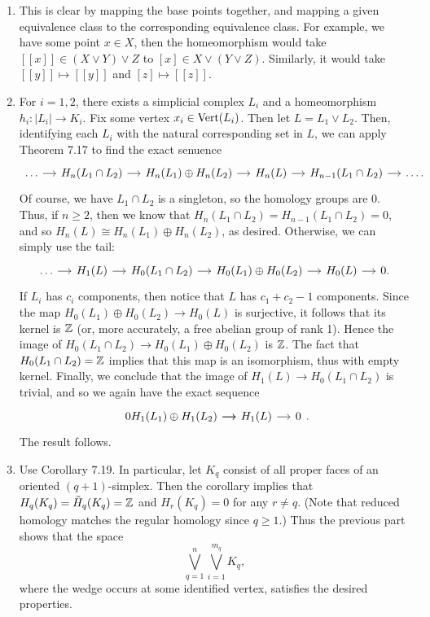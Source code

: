 \documentclass[../../solutions.tex]{subfiles}
\begin{document}
\begin{exercise} \leavevmode
\begin{enumerate}
\item
This is clear by mapping the base points together, and mapping a given equivalence class to the corresponding equivalence class.
For example, we have some point $x\in X$, then the homeomorphism would take $[[x]]\in(X\vee Y)\vee Z$ to $[x]\in X\vee(Y\vee Z)$.
Similarly, it would take $[[y]]\mapsto[[y]]$ and $[z]\mapsto[[z]]$.

\item
For $i=1,2$, there exists a simplicial complex $L_i$ and a homeomorphism $h_i:|L_i|\to K_i$.
Fix some vertex $x_i\in\operatorname{Vert}(L_i)$.
Then let $L=L_1\vee L_2$.
Then, identifying each $L_i$ with the natural corresponding set in $L$, we can apply Theorem 7.17 to find the exact senuence
\[
\begin{tikzcd}[column sep=small]
\dots\ar[r] & H_n(L_1\cap L_2)\ar[r] & H_n(L_1)\oplus H_n(L_2)\ar[r] & H_n(L)\ar[r] & H_{n-1}(L_1\cap L_2)\ar[r] & \dots.
\end{tikzcd}
\]
Of course, we have $L_1\cap L_2$ is a singleton, so the homology groups are 0.
Thus, if $n\ge2$, then we know that $H_n(L_1\cap L_2)=H_{n-1}(L_1\cap L_2)=0$, and so $H_n(L)\cong H_n(L_1)\oplus H_n(L_2)$, as desired.
Otherwise, we can simply use the tail:
\[
\begin{tikzcd}[column sep=small]
\dots\ar[r] & H_1(L)\ar[r] & H_0(L_1\cap L_2)\ar[r] & H_0(L_1)\oplus H_0(L_2)\ar[r] & H_0(L)\ar[r] & 0.
\end{tikzcd}
\]
If $L_i$ has $c_i$ components, then notice that $L$ has $c_1+c_2-1$ components.
Since the map $H_0(L_1)\oplus H_0(L_2)\to H_0(L)$ is surjective, it follows that its kernel is $\mathbb{Z}$ (or, more accurately, a free abelian group of rank 1).
Hence the image of $H_0(L_1\cap L_2)\to H_0(L_1)\oplus H_0(L_2)$ is $\mathbb{Z}$.
The fact that $H_0(L_1\cap L_2)=\mathbb{Z}$ implies that this map is an isomorphism, thus with empty kernel.
Finally, we conclude that the image of $H_1(L)\to H_0(L_1\cap L_2)$ is trivial, and so we again have the exact sequence
\[
\begin{tikzcd}[column sep=small]
0\ar[r] H_1(L_1)\oplus H_1(L_2)\ar[r] & H_1(L)\ar[r] & 0
\end{tikzcd}.
\]
The result follows.

\item
Use Corollary 7.19.
In particular, let $K_q$ consist of all proper faces of an oriented $(q+1)$-simplex.
Then the corollary implies that $H_q(K_q)=\tilde H_q(K_q)=\mathbb{Z}$ and $H_r(K_q)=0$ for any $r\ne q$.
(Note that reduced homology matches the regular homology since $q\ge 1$.)
Thus the previous part shows that the space
\[\bigvee_{q=1}^n\bigvee_{i=1}^{m_q}K_q,\]
where the wedge occurs at some identified vertex, satisfies the desired properties.
\end{enumerate}
\end{exercise}
\end{document}
